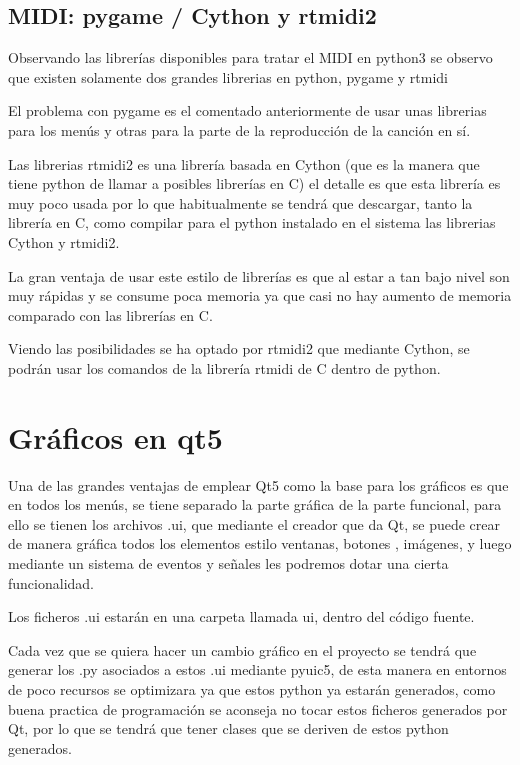 \documentclass[a4paper,11pt,oneside]{book}
\begin{document}
\subsection{MIDI: pygame / Cython y rtmidi2}
Observando las librerías disponibles para tratar el MIDI en python3 se observo que existen solamente dos grandes librerias en python, pygame y rtmidi

El problema con pygame es el comentado anteriormente de usar unas librerias para los menús y otras para la parte de la reproducción de la canción en sí.

Las librerias rtmidi2 es una librería basada en Cython (que es la manera que tiene python de llamar a posibles librerías en C) el detalle es que esta librería es muy poco usada por lo que habitualmente se tendrá que descargar, tanto la librería en C, como compilar para el python instalado en el sistema las librerias Cython y rtmidi2.
 
La gran ventaja de usar este estilo de librerías es que al estar a tan bajo nivel son muy rápidas y se consume poca memoria ya que casi no hay aumento de memoria comparado con las librerías en C.

 
Viendo las posibilidades se ha optado por rtmidi2 que mediante Cython, se podrán usar los comandos de la librería rtmidi de C dentro de python.


\section{Gráficos en qt5}

Una de las grandes ventajas de emplear Qt5 como la base para los gráficos es que en todos los menús, se tiene separado la parte gráfica de la parte funcional, para ello se tienen los archivos .ui, que mediante el creador que da Qt, se puede crear de manera gráfica todos los elementos estilo ventanas, botones , imágenes, y luego mediante un sistema de eventos y señales les podremos dotar una cierta funcionalidad.

Los ficheros .ui estarán en una carpeta llamada ui, dentro del código fuente.

Cada vez que se quiera hacer un cambio gráfico en el proyecto se tendrá que generar los .py asociados a estos .ui mediante pyuic5, de esta manera en entornos de poco recursos se optimizara ya que estos python ya estarán generados, como buena practica de programación se aconseja no tocar estos ficheros generados por Qt, por lo que se tendrá que tener clases que se deriven de estos python generados.
\end{document}

